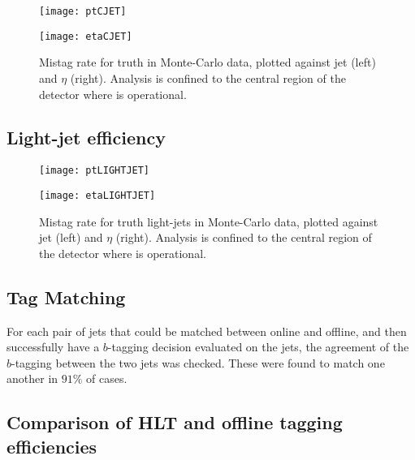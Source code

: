 		\begin{figure}[h]
			\centering
			\begin{minipage}[h]{0.45\linewidth}
				\texttt{[image: ptCJET]}

			\end{minipage}
			\quad
			\begin{minipage}[h]{0.45\linewidth}
				\texttt{[image: etaCJET]}
			\end{minipage}
			\caption{Mistag rate for truth \bjets in Monte-Carlo data, plotted against jet \pt (left) and $\eta$ (right). Analysis is confined to the central region of the detector where \btagging is operational.}
			\label{fig:MC:cjetefficiency}
		\end{figure}

	\subsection{Light-jet efficiency}

		\begin{figure}[h]
			\centering
			\begin{minipage}[h]{0.45\linewidth}
				\texttt{[image: ptLIGHTJET]}

			\end{minipage}
			\quad
			\begin{minipage}[h]{0.45\linewidth}
				\texttt{[image: etaLIGHTJET]}
			\end{minipage}
			\caption{Mistag rate for truth light-jets in Monte-Carlo data, plotted against jet \pt (left) and $\eta$ (right). Analysis is confined to the central region of the detector where \btagging is operational.}
			\label{fig:MC:lightjetefficiency}
		\end{figure}


	\subsection{Tag Matching}

	For each pair of jets that could be matched between online and offline, and then successfully have a $b$-tagging decision evaluated on the jets, the agreement of the $b$-tagging between the two jets was checked. These were found to match one another in $91\%$ of cases.

	\subsection{Comparison of HLT and offline tagging efficiencies}

